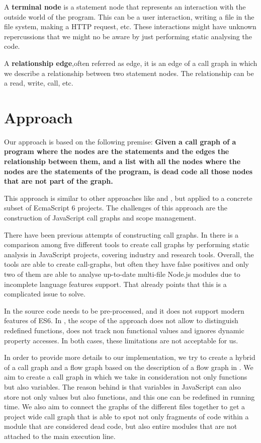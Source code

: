 \documentclass{uvamscse}
\begin{document}
A \textbf{terminal node} is a statement node that represents an interaction with the outside world of the program. This can be a user interaction, writing a file in the file system, making a HTTP request, etc. These interactions might have unknown repercussions that we might no be aware by just performing static analysing the code.

A \textbf{relationship edge},often referred as edge, it is an edge of a call graph in which we describe a relationship between two statement nodes. The relationship can be a read, write, call, etc.

\section{Approach}
Our approach is based on the following premise: \textbf{Given a call graph of a program where the nodes are the statements and the edges the relationship between them, and a list with all the nodes where the nodes are the statements of the program, is dead code all those nodes that are not part of the graph.}

This approach is similar to other approaches like \cite{JavaDeadCode} and \cite{ieee_s8330226}, but applied to a concrete subset of EcmaScript 6 projects. The challenges of this approach are the construction of JavaScript call graphs and scope management.

There have been previous attempts of constructing call graphs. In \cite{metaCallGraphs} there is a comparison among five different tools to create call graphs by performing static analysis in JavaScript projects, covering industry and research tools. Overall, the tools are able to create call-graphs, but often they have false positives and only two of them are able to analyse up-to-date multi-file Node.js modules due to incomplete language features support. That already points that this is a complicated issue to solve.

In \cite{JSWALA} the source code needs to be pre-processed, and it does not support modern features of ES6. In \cite{FeldthausAsger2013Ecoa}, the scope of the approach does not allow to distinguish redefined functions, does not track non functional values and ignores dynamic property accesses. In both cases, these limitations are not acceptable for us.

In order to provide more details to our implementation, we try to create a hybrid of a call graph and a flow graph based on the description of a flow graph in \cite{tajs2009}. We aim to create a call graph in which we take in consideration not only functions but also variables. The reason behind is that variables in JavaScript can also store not only values but also functions, and this one can be redefined in running time. We also aim to connect the graphs of the different files together to get a project wide call graph that is able to spot not only fragments of code within a module that are considered dead code, but also entire modules that are not attached to the main execution line.
\end{document}
